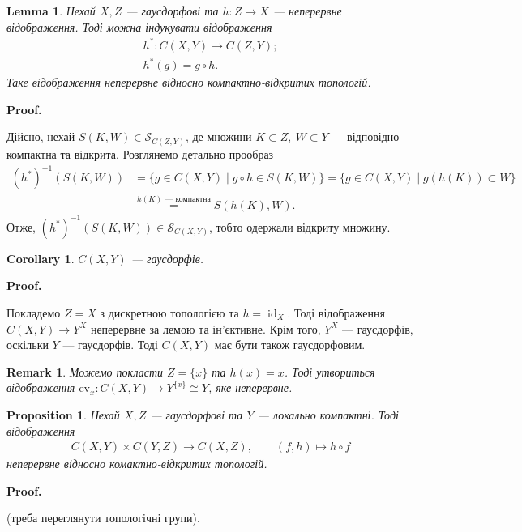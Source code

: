\documentclass[a4paper, 10pt]{article}
\makeatletter
\theoremstyle{theoremdd}
\newtheorem{proposition}[theorem]{Proposition}
\newtheorem{remark}[theorem]{Remark}
\newtheorem{lemma}[theorem]{Lemma}
\newtheorem{corollary}[theorem]{Corollary}
\DeclareMathOperator{\id}{id}
\renewenvironment{proof}[1][Proof.\\]{\par
\pushQED{\hfill \qed}%
\normalfont \topsep6\p@\@plus6\p@\relax
\trivlist
\item\relax
{\bfseries
#1\@addpunct{.}}\hspace\labelsep\ignorespaces
}{%
\popQED\endtrivlist\@endpefalse
}
\makeatother
\begin{document}
\begin{lemma}
Нехай $X,Z$ --- гаусдорфові та $h \colon Z \to X$ --- неперервне відображення. Тоді можна індукувати відображення
\begin{align*}
h^* \colon C(X,Y) \to C(Z,Y); \\
h^*(g) = g \circ h.
\end{align*}
Таке відображення неперервне відносно компактно-відкритих топологій.
\end{lemma}

\begin{proof}
Дійсно, нехай $S(K,W) \in \mathcal{S}_{C(Z,Y)}$, де множини $K \subset Z,\ W \subset Y$ --- відповідно компактна та відкрита. Розглянемо детально прообраз
\begin{align*}
(h^*)^{-1}(S(K,W)) & = \{ g \in C(X,Y) \mid g \circ h \in S(K,W) \} = \{ g \in C(X,Y) \mid g(h(K)) \subset W \} \\
& \overset{h(K) \text{ --- компактна}}{=} S(h(K),W).
\end{align*}
Отже, $(h^*)^{-1}(S(K,W)) \in \mathcal{S}_{C(X,Y)}$, тобто одержали відкриту множину.
\end{proof}

\begin{corollary}
$C(X,Y)$ --- гаусдорфів.
\end{corollary}

\begin{proof}
Покладемо $Z = X$ з дискретною топологією та $h = \id_X$. Тоді відображення $C(X,Y) \to Y^X$ неперервне за лемою та ін'єктивне. Крім того, $Y^X$ --- гаусдорфів, оскільки $Y$ --- гаусдорфів. Тоді $C(X,Y)$ має бути також гаусдорфовим.
\end{proof}

\begin{remark}
Можемо покласти $Z = \{x\}$ та $h(x) = x$. Тоді утвориться відображення $\text{ev}_x \colon C(X,Y) \to Y^{\{x\}} \cong Y$, яке неперервне.
\end{remark}

\begin{proposition}
Нехай $X,Z$ --- гаусдорфові та $Y$ --- локально компактні. Тоді відображення
\begin{align*}
C(X,Y) \times C(Y,Z) \to C(X,Z), \qquad (f,h) \mapsto h \circ f
\end{align*}
неперервне відносно комактно-відкритих топологій.
\end{proposition}

\begin{proof}
(треба переглянути топологічні групи).
\end{proof}
\end{document}
